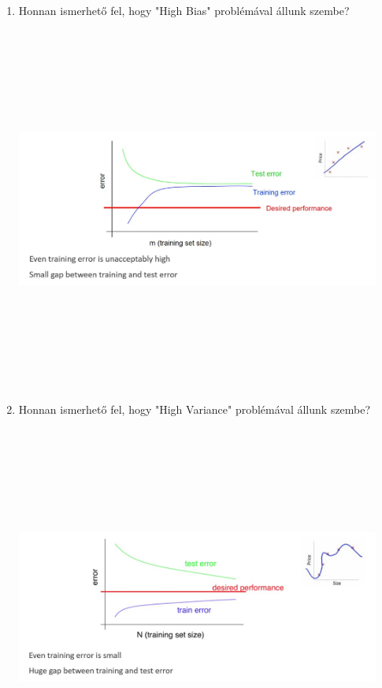 \documentclass[12pt]{article}
\begin{document}
\begin{enumerate}
\item Honnan ismerhető fel, hogy "High Bias" problémával állunk szembe?
\begin{center}
\includegraphics[width=12cm,height=12cm,keepaspectratio]{./pics/ProblemBias.jpg}
\end{center}
\newpage
\item Honnan ismerhető fel, hogy "High Variance" problémával állunk szembe?
\begin{center}
\includegraphics[width=12cm,height=12cm,keepaspectratio]{./pics/ProblemVariance.jpg}
\end{center}


\end{enumerate}
\end{document}
